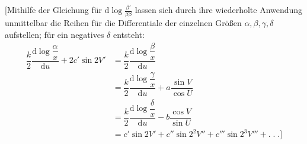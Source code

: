 [Mithilfe der Gleichung für $\mathrm{d}\log\frac{\beta'}{\beta\beta}$ lassen sich durch ihre wiederholte Anwendung unmittelbar die Reihen für die Differentiale der einzelnen Größen $\alpha,\allowbreak \beta,\allowbreak \gamma,\allowbreak \delta$ aufstellen; für ein negatives $\delta$ entsteht:
\[
\begin{aligned}\dfrac{k}{2}\dfrac{\mathrm{d}\log\dfrac{\alpha}{x}}{\mathrm{d}u}+2c'\sin 2V'
&=\dfrac{k}{2}\dfrac{\mathrm{d}\log\dfrac{\beta}{x}}{\mathrm{d}u}
\\[7pt]&=\dfrac{k}{2}\dfrac{\mathrm{d}\log\dfrac{\gamma}{x}}{\mathrm{d}u}+a\dfrac{\sin V}{\cos U}
\\[7pt]&=\dfrac{k}{2}\dfrac{\mathrm{d}\log\dfrac{\delta}{x}}{\mathrm{d}u}-b\dfrac{\cos V}{\sin U}
\\[7pt]&=c'\sin 2V'+c''\sin 2^2V''+c'''\sin 2^3V'''+.\;.\;.\text{]}\end{aligned}
\]


